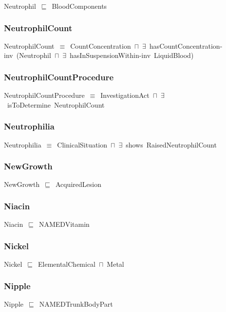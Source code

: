 \documentclass{article}
\begin{document}
Neutrophil~\ensuremath{\sqsubseteq}~BloodComponents~

\subsubsection*{NeutrophilCount}

NeutrophilCount~\ensuremath{\equiv}~CountConcentration~\ensuremath{\sqcap}~\ensuremath{\exists}~hasCountConcentration-inv~(Neutrophil~\ensuremath{\sqcap}~\ensuremath{\exists}~hasInSuspensionWithin-inv~LiquidBlood)

\subsubsection*{NeutrophilCountProcedure}

NeutrophilCountProcedure~\ensuremath{\equiv}~InvestigationAct~\ensuremath{\sqcap}~\ensuremath{\exists}~isToDetermine~NeutrophilCount

\subsubsection*{Neutrophilia}

Neutrophilia~\ensuremath{\equiv}~ClinicalSituation~\ensuremath{\sqcap}~\ensuremath{\exists}~shows~RaisedNeutrophilCount

\subsubsection*{NewGrowth}

NewGrowth~\ensuremath{\sqsubseteq}~AcquiredLesion~

\subsubsection*{Niacin}

Niacin~\ensuremath{\sqsubseteq}~NAMEDVitamin~

\subsubsection*{Nickel}

Nickel~\ensuremath{\sqsubseteq}~ElementalChemical~\ensuremath{\sqcap}~Metal~

\subsubsection*{Nipple}

Nipple~\ensuremath{\sqsubseteq}~NAMEDTrunkBodyPart~
\end{document}
